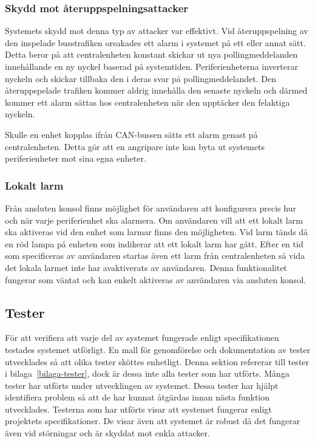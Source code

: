 \documentclass[a4paper]{article}
\begin{document}
\subsubsection{Skydd mot återuppspelningsattacker}
Systemets skydd mot denna typ av attacker var effektivt.
Vid återuppspelning av den inspelade busstrafiken orsakades ett alarm i systemet på ett eller annat sätt.
Detta beror på att centralenheten konstant skickar ut nya pollingmeddelanden innehållande en ny nyckel baserad på systemtiden.
Periferienheterna inverterar nyckeln och skickar tillbaka den i deras svar på pollingmeddelandet.
Den återuppspelade trafiken kommer aldrig innehålla den senaste nyckeln och därmed kommer ett alarm sättas hos centralenheten när den upptäcker den felaktiga nyckeln.

Skulle en enhet kopplas ifrån CAN-bussen sätts ett alarm genast på centralenheten.
Detta gör att en angripare inte kan byta ut systemets periferienheter mot sina egna enheter.

\subsubsection{Lokalt larm}
Från ansluten konsol finns möjlighet för användaren att konfigurera precis hur och när varje periferienhet ska alarmera.
Om användaren vill att ett lokalt larm ska aktiveras vid den enhet som larmar finns den möjligheten.
Vid larm tänds då en röd lampa på enheten som indikerar att ett lokalt larm har gått.
Efter en tid som specificeras av användaren startas även ett larm från centralenheten så vida det lokala larmet inte har avaktiverats av användaren.
Denna funktionalitet fungerar som väntat och kan enkelt aktiveras av användaren via ansluten konsol.

\subsection{Tester}
För att verifiera att varje del av systemet fungerade enligt specifikationen testades systemet utförligt.
En mall för genomförelse och dokumentation av tester utvecklades så att olika tester sköttes enhetligt.
Denna sektion refererar till tester i bilaga~\ref{bilaga-tester}, dock är dessa inte alla tester som har utförts.
Många tester har utförts under utvecklingen av systemet.
Dessa tester har hjälpt identifiera problem så att de har kunnat åtgärdas innan nästa funktion utvecklades.
Testerna som har utförts visar att systemet fungerar enligt projektets specifikationer.
De visar även att systemet är robust då det fungerar även vid störningar och är skyddat mot enkla attacker.
\end{document}
